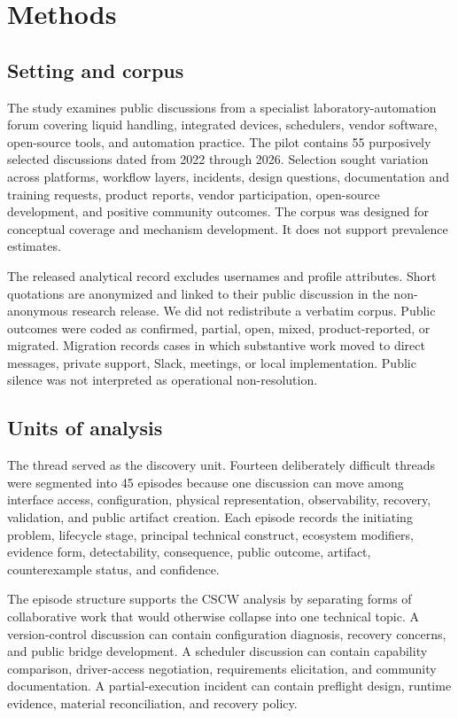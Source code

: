 \section{Methods}

\subsection{Setting and corpus}

The study examines public discussions from a specialist laboratory-automation forum covering liquid handling, integrated devices, schedulers, vendor software, open-source tools, and automation practice. The pilot contains 55 purposively selected discussions dated from 2022 through 2026. Selection sought variation across platforms, workflow layers, incidents, design questions, documentation and training requests, product reports, vendor participation, open-source development, and positive community outcomes. The corpus was designed for conceptual coverage and mechanism development. It does not support prevalence estimates.

The released analytical record excludes usernames and profile attributes. Short quotations are anonymized and linked to their public discussion in the non-anonymous research release. We did not redistribute a verbatim corpus. Public outcomes were coded as confirmed, partial, open, mixed, product-reported, or migrated. Migration records cases in which substantive work moved to direct messages, private support, Slack, meetings, or local implementation. Public silence was not interpreted as operational non-resolution.

\subsection{Units of analysis}

The thread served as the discovery unit. Fourteen deliberately difficult threads were segmented into 45 episodes because one discussion can move among interface access, configuration, physical representation, observability, recovery, validation, and public artifact creation. Each episode records the initiating problem, lifecycle stage, principal technical construct, ecosystem modifiers, evidence form, detectability, consequence, public outcome, artifact, counterexample status, and confidence.

The episode structure supports the CSCW analysis by separating forms of collaborative work that would otherwise collapse into one technical topic. A version-control discussion can contain configuration diagnosis, recovery concerns, and public bridge development. A scheduler discussion can contain capability comparison, driver-access negotiation, requirements elicitation, and community documentation. A partial-execution incident can contain preflight design, runtime evidence, material reconciliation, and recovery policy.

